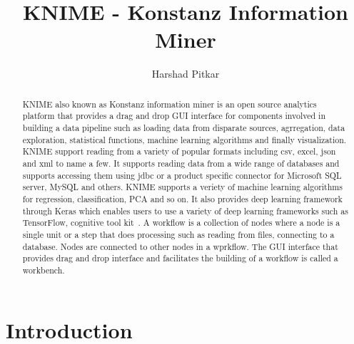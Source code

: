 \title{KNIME - Konstanz Information Miner}


\author{Harshad Pitkar}



\renewcommand{\shortauthors}{Harshad Pitkar}


\begin{abstract}

KNIME also known as Konstanz information miner is an open source
analytics platform that provides a drag and drop GUI interface for
components involved in building a data pipeline such as loading data
from disparate sources, agrregation, data exploration, statistical
functions, machine learning algorithms and finally visualization.
KNIME support reading from a variety of popular formats including csv,
excel, json and xml to name a few. It supports reading data from a
wide range of databases and supports accessing them using jdbc or a
product specific connector for Microsoft SQL server, MySQL and others.
KNIME supports a veriety of machine learning algorithms for
regression, classification, PCA and so on. It also provides deep
learning framework through Keras which enables users to use a variety
of deep learning frameworks such as TensorFlow, cognitive tool
kit~\cite{hid-sp18-517-kdl}. A workflow is a collection of nodes where
a node is a single unit or a step that does processing such as reading
from files, connecting to a database. Nodes are connected to other
nodes in a wprkflow. The GUI interface that provides drag and drop
interface and facilitates the building of a workflow is called a
workbench.

\end{abstract}



\maketitle

\section{Introduction}

